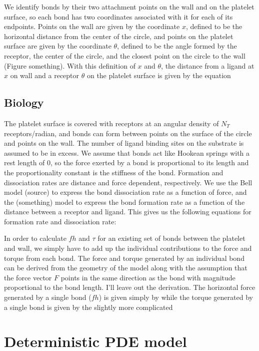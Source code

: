 We identify bonds by their two attachment points on the wall and on
the platelet surface, so each bond has two coordinates associated with
it for each of its endpoints. Points on the wall are given by the
coordinate $x$, defined to be the horizontal distance from the center
of the circle, and points on the platelet surface are given by the
coordinate $\theta$, defined to be the angle formed by the receptor,
the center of the circle, and the closest point on the circle to the
wall (Figure something). With this definition of $x$ and $\theta$, the
distance from a ligand at $x$ on wall and a receptor $\theta$ on the
platelet surface is given by the equation

\subsection{Biology}
\label{sec:biology}

The platelet surface is covered with receptors at an angular density
of $N_T$ receptors/radian, and bonds can form between points on the
surface of the circle and points on the wall. The number of ligand
binding sites on the substrate is assumed to be in excess. We assume
that bonds act like Hookean springs with a rest length of 0, so the
force exerted by a bond is proportional to its length and the
proportionality constant is the stiffness of the bond. Formation and
dissociation rates are distance and force dependent, respectively. We
use the Bell model (source) to express the bond dissociation rate as a
function of force, and the (something) model to express the bond
formation rate as a function of the distance between a receptor and
ligand. This gives us the following equations for formation rate and
dissociation rate:

In order to calculate $fh$ and $\tau$ for an existing set of bonds
between the platelet and wall, we simply have to add up the individual
contributions to the force and torque from each bond. The force and
torque generated by an individual bond can be derived from the
geometry of the model along with the assumption that the force vector
$F$ points in the same direction as the bond with magnitude
proportional to the bond length. I'll leave out the derivation. The
horizontal force generated by a single bond ($fh$) is given simply by
while the torque generated by a single bond is given by the slightly
more complicated

\section{Deterministic PDE model}
\label{sec:determ-pde-model}

